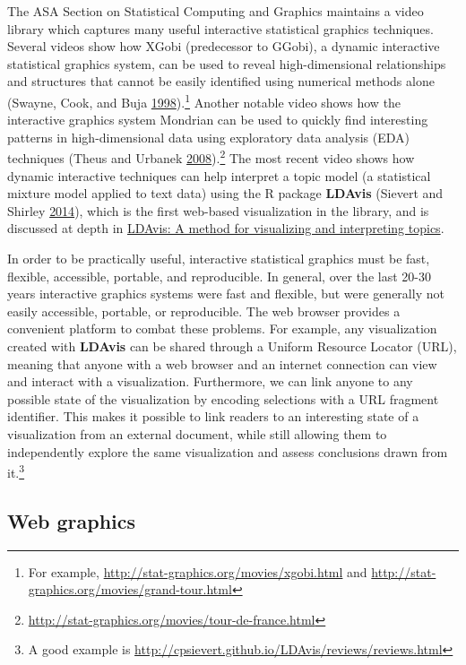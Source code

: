 \documentclass[12pt,]{isuthesis}
\let\rmarkdownfootnote\footnote%
\def\footnote{\protect\rmarkdownfootnote}
\begin{document}
The ASA Section on Statistical Computing and Graphics maintains a video
library which captures many useful interactive statistical graphics
techniques. Several videos show how XGobi (predecessor to GGobi), a
dynamic interactive statistical graphics system, can be used to reveal
high-dimensional relationships and structures that cannot be easily
identified using numerical methods alone (Swayne, Cook, and Buja
\protect\hyperlink{ref-xgobi}{1998}).\footnote{For example,
  \url{http://stat-graphics.org/movies/xgobi.html} and
  \url{http://stat-graphics.org/movies/grand-tour.html}} Another notable
video shows how the interactive graphics system Mondrian can be used to
quickly find interesting patterns in high-dimensional data using
exploratory data analysis (EDA) techniques (Theus and Urbanek
\protect\hyperlink{ref-mondrianbook}{2008}).\footnote{\url{http://stat-graphics.org/movies/tour-de-france.html}}
The most recent video shows how dynamic interactive techniques can help
interpret a topic model (a statistical mixture model applied to text
data) using the R package \textbf{LDAvis} (Sievert and Shirley
\protect\hyperlink{ref-Sievert:2014b}{2014}), which is the first
web-based visualization in the library, and is discussed at depth in
\protect\hyperlink{ldavis-a-method-for-visualizing-and-interpreting-topics}{LDAvis:
A method for visualizing and interpreting topics}.

In order to be practically useful, interactive statistical graphics must
be fast, flexible, accessible, portable, and reproducible. In general,
over the last 20-30 years interactive graphics systems were fast and
flexible, but were generally not easily accessible, portable, or
reproducible. The web browser provides a convenient platform to combat
these problems. For example, any visualization created with
\textbf{LDAvis} can be shared through a Uniform Resource Locator (URL),
meaning that anyone with a web browser and an internet connection can
view and interact with a visualization. Furthermore, we can link anyone
to any possible state of the visualization by encoding selections with a
URL fragment identifier. This makes it possible to link readers to an
interesting state of a visualization from an external document, while
still allowing them to independently explore the same visualization and
assess conclusions drawn from it.\footnote{A good example is
  \url{http://cpsievert.github.io/LDAvis/reviews/reviews.html}}

\subsection{Web graphics}\label{web-graphics}
\end{document}

